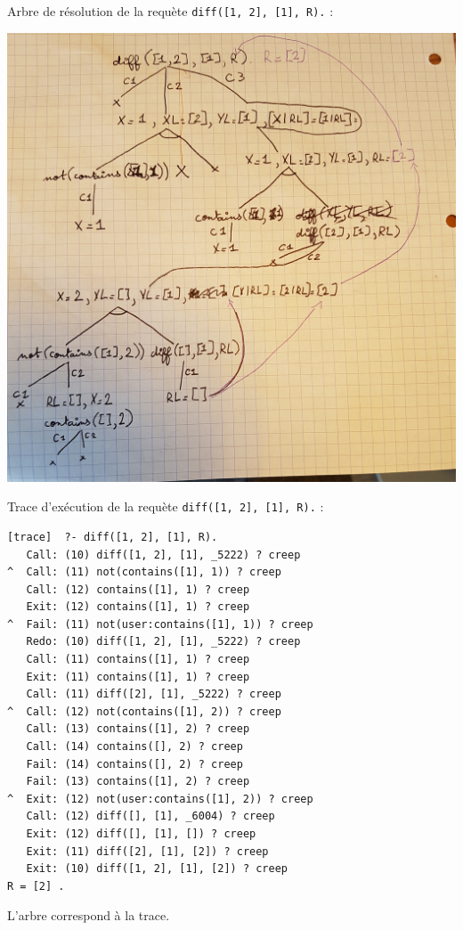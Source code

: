 \documentclass{article}
\begin{document}
Arbre de résolution de la requète \texttt{diff([1, 2], [1], R).} :

\includegraphics[width=\textwidth]{arbre_ex6}

Trace d'exécution de la requète \texttt{diff([1, 2], [1], R).} :
\begin{verbatim}
[trace]  ?- diff([1, 2], [1], R).
   Call: (10) diff([1, 2], [1], _5222) ? creep
^  Call: (11) not(contains([1], 1)) ? creep
   Call: (12) contains([1], 1) ? creep
   Exit: (12) contains([1], 1) ? creep
^  Fail: (11) not(user:contains([1], 1)) ? creep
   Redo: (10) diff([1, 2], [1], _5222) ? creep
   Call: (11) contains([1], 1) ? creep
   Exit: (11) contains([1], 1) ? creep
   Call: (11) diff([2], [1], _5222) ? creep
^  Call: (12) not(contains([1], 2)) ? creep
   Call: (13) contains([1], 2) ? creep
   Call: (14) contains([], 2) ? creep
   Fail: (14) contains([], 2) ? creep
   Fail: (13) contains([1], 2) ? creep
^  Exit: (12) not(user:contains([1], 2)) ? creep
   Call: (12) diff([], [1], _6004) ? creep
   Exit: (12) diff([], [1], []) ? creep
   Exit: (11) diff([2], [1], [2]) ? creep
   Exit: (10) diff([1, 2], [1], [2]) ? creep
R = [2] .
\end{verbatim}

L'arbre correspond à la trace.
\end{document}
